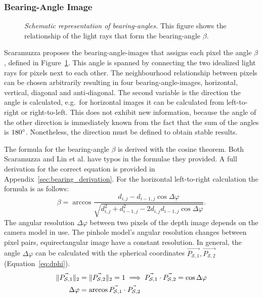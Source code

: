 \subsubsection{Bearing-Angle Image}

\begin{figure}[b!]
    \centering
    \scalebox{0.9}{%
    }
    \caption[Schematic representation of \glspl{bearing-angle}]{\emph{Schematic representation of \glspl{bearing-angle}.} This figure shows the relationship of the light rays that form the \gls{bearing-angle} $\beta$.}\label{fig:bearing_angle}
\end{figure}
Scaramuzza\cite{scaramuzza_iros2007} proposes the \Glspl{bearing-angle-image} that assigns each pixel the angle $\beta$, defined in Figure~\ref{fig:bearing_angle}.
This angle is spanned by connecting the two idealized light rays for pixels next to each other.
The neighbourhood relationship between pixels can be chosen arbitrarily resulting in four \Glspl{bearing-angle-image}, horizontal, vertical, diagonal and anti-diagonal.
The second variable is the direction the angle is calculated, e.g.~for horizontal images it can be calculated from left-to-right or right-to-left.
This does not exhibit new information, because the angle of the other direction is immediately known from the fact that the sum of the angles is $180\degree$.
Nonetheless, the direction must be defined to obtain stable results.

The formula for the \gls{bearing-angle} $\beta$ is derived with the cosine theorem.
Both Scaramuzza\cite{scaramuzza_iros2007} and Lin et al.\cite{lin_easp2017} have typos in the formulae they provided.
A full derivation for the correct equation is provided in Appendix~\ref{sec:bearing_derivation}.
For the horizontal left-to-right calculation the formula is as follows:
\begin{equation}\label{eq:bearing-angle}
    \beta = \arccos%
            \frac{d_{i,j} - d_{i-1,j} \cos \Delta\varphi}%
                {\sqrt{d_{i,j}^2 + d_{i-1,j}^2 - 2 d_{i,j} d_{i-1,j} \cos \Delta\varphi}}\text{.}
\end{equation}
The angular resolution $\Delta\varphi$ between two pixels of the depth image depends on the camera model in use.
The pinhole model's angular resolution changes between pixel pairs, equirectangular image have a constant resolution.
In general, the angle $\Delta\varphi$ can be calculated with the spherical coordinates $\vec{P_{\mathcal{S},1}}, \vec{P_{\mathcal{S},2}}$ (Equation~\ref{eq:dphi}).
\pagebreak
\begin{equation}
\begin{aligned}
    \lVert\vec{P_{\mathcal{S},1}}\rVert_{2} &= \lVert\vec{P_{\mathcal{S},2}}\rVert_{2} = 1 \implies \vec{P_{\mathcal{S},1}} \cdot \vec{P_{\mathcal{S},2}} = \cos \Delta\varphi \\
    \Delta\varphi &= \arccos \vec{P_{\mathcal{S},1}} \cdot \vec{P_{\mathcal{S},2}}
    \label{eq:dphi}
\end{aligned}
\end{equation}

